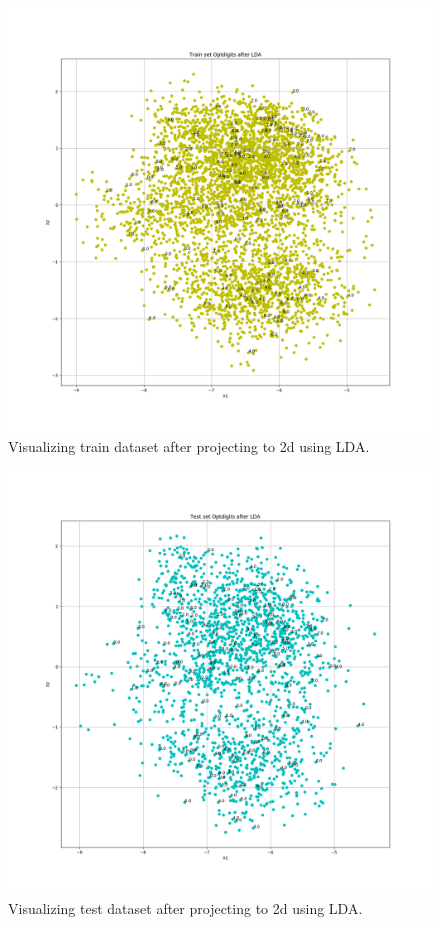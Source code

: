 \documentclass[12pt]{article}
\begin{document}
\begin{figure}[ht]
	\centerline{\includegraphics[width=5in]{trainoptdigits.png}}
	\caption{Visualizing train dataset after projecting to 2d using LDA.}
	\label{fig:trainopt}
\end{figure}
\begin{figure}[ht]
	\centerline{\includegraphics[width=5in]{testoptdigits.png}}
	\caption{Visualizing test dataset after projecting to 2d using LDA.}
	\label{fig:testopt}
\end{figure}
\end{document}
